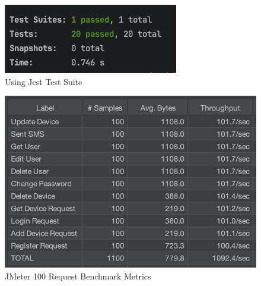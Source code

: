 \begin{figure}[htbp]
      \centering
      \includegraphics[width=1\linewidth]{datasets/images/Jest-Test-Suite.png}
      \caption{Using Jest Test Suite}
      \label{fig:figure2}

\end{figure}

\begin{figure}[htbp]
      \centering
      \includegraphics[width=1\linewidth]{datasets/images/JMeter_100reqBenchmark.png}
      \caption{JMeter 100 Request Benchmark Metrics}
      \label{fig:figure3}
\end{figure}

